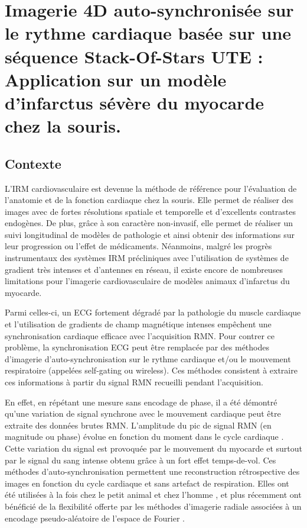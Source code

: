 \chapter{Imagerie 4D auto-synchronisée sur le rythme cardiaque basée sur une séquence Stack-Of-Stars UTE : Application sur un modèle d'infarctus sévère du myocarde chez la souris.}

\setlength{\footskip}{50pt}
\label{Chap5}
\section{Contexte}

L’IRM cardiovasculaire est devenue la méthode de référence pour l'évaluation de l’anatomie et de la fonction cardiaque chez la souris. Elle permet de réaliser des images avec de fortes résolutions spatiale et temporelle et d’excellents contrastes endogènes. De plus, grâce à son caractère non-invasif, elle permet de réaliser un suivi longitudinal de modèles de pathologie et ainsi obtenir des informations sur leur progression ou l’effet de médicaments.
Néanmoins, malgré les progrès instrumentaux des systèmes IRM précliniques avec l’utilisation de systèmes de gradient très intenses et d’antennes en réseau, il existe encore de nombreuses limitations pour l’imagerie cardiovasculaire de modèles animaux d’infarctus du myocarde.

Parmi celles-ci, un ECG fortement dégradé par la pathologie du muscle cardiaque et l’utilisation de gradients de champ magnétique intenses empêchent une synchronisation cardiaque efficace avec l’acquisition RMN. Pour contrer ce problème, la synchronisation ECG peut être remplacée par des méthodes d’imagerie d’auto-synchronisation sur le rythme cardiaque et/ou le mouvement respiratoire \cite{spraggins1990wireless,kim1990extraction} (appelées self-gating ou wireless). Ces méthodes consistent à extraire ces informations à partir du signal RMN recueilli pendant l'acquisition.

En effet, en répétant une mesure sans encodage de phase, il a été démontré qu’une variation de signal synchrone avec le mouvement cardiaque peut être extraite des données brutes RMN. L’amplitude du pic de signal RMN (en magnitude ou phase) évolue en fonction du moment dans le cycle cardiaque \cite{Larson2004Self-gated-card,crowe2004automated}. Cette variation du signal est provoquée par le mouvement du myocarde et surtout par le signal du sang intense obtenu grâce à un fort effet temps-de-vol. Ces méthodes d'auto-synchronisation permettent une reconstruction rétrospective des images en fonction du cycle cardiaque et sans artefact de respiration. Elles ont été utilisées à la fois chez le petit animal \cite{hiba2006cardiac,Heijman:2007aa,Hiba:2007aa,Bovens:2011aa} et chez l’homme \cite{Larson:2005aa,crowe2004automated,ingle2015self}, et plus récemment ont bénéficié de la flexibilité offerte par les méthodes d’imagerie radiale associées à un encodage pseudo-aléatoire de l’espace de Fourier \cite{Konstandin:2011fk,kramer2014retrospective,kramer2015self,paul2015high,Motaal:2015aa}. 

